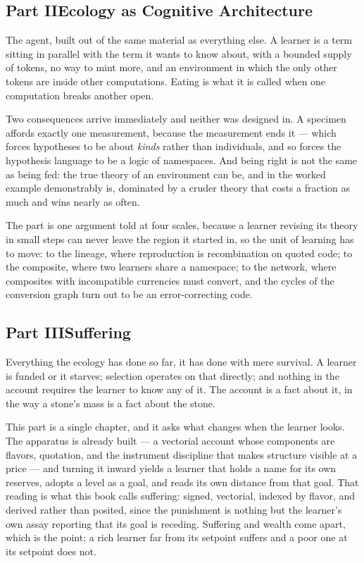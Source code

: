 \documentclass[12pt,openright,twoside]{book}
\theoremstyle{remark}
\theoremstyle{plain}
\theoremstyle{remark}
\theoremstyle{plain}
\theoremstyle{plain}
\begin{document}
\subsection*{Part II\quad Ecology as Cognitive Architecture}

The agent, built out of the same material as everything else.
A learner is a term sitting in parallel with the term it wants to know
about, with a bounded supply of tokens, no way to mint more, and an
environment in which the only other tokens are inside other computations.
Eating is what it is called when one computation breaks another open.

Two consequences arrive immediately and neither was designed in.
A specimen affords exactly one measurement, because the measurement ends
it --- which forces hypotheses to be about \emph{kinds} rather than
individuals, and so forces the hypothesis language to be a logic of
namespaces.
And being right is not the same as being fed: the true theory of an
environment can be, and in the worked example demonstrably is, dominated
by a cruder theory that costs a fraction as much and wins nearly as
often.

The part is one argument told at four scales, because a learner revising
its theory in small steps can never leave the region it started in, so
the unit of learning has to move: to the lineage, where reproduction is
recombination on quoted code; to the composite, where two learners share
a namespace; to the network, where composites with incompatible
currencies must convert, and the cycles of the conversion graph turn out
to be an error-correcting code.

\subsection*{Part III\quad Suffering}

Everything the ecology has done so far, it has done with mere survival.
A learner is funded or it starves; selection operates on that directly;
and nothing in the account requires the learner to know any of it.
The account is a fact about it, in the way a stone's mass is a fact about
the stone.

This part is a single chapter, and it asks what changes when the learner
looks.
The apparatus is already built --- a vectorial account whose components
are flavors, quotation, and the instrument discipline that makes
structure visible at a price --- and turning it inward yields a learner
that holds a name for its own reserves, adopts a level as a goal, and
reads its own distance from that goal.
That reading is what this book calls suffering: signed, vectorial,
indexed by flavor, and derived rather than posited, since the punishment
is nothing but the learner's own assay reporting that its goal is
receding.
Suffering and wealth come apart, which is the point; a rich learner far
from its setpoint suffers and a poor one at its setpoint does not.
\end{document}
